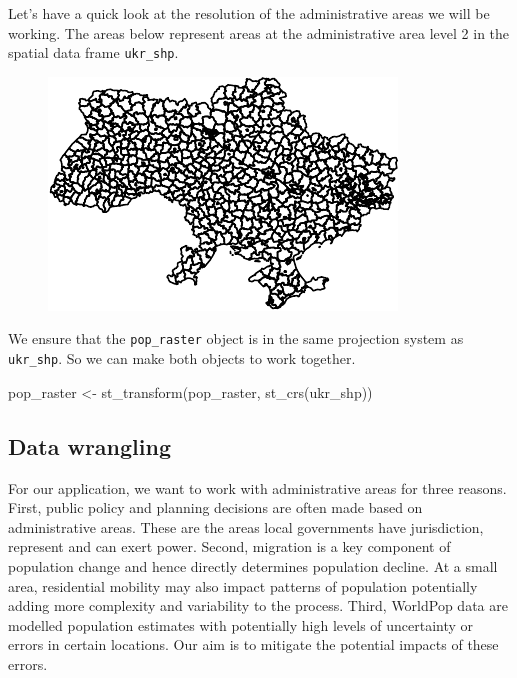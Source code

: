 \documentclass[
  letterpaper,
  DIV=11,
  numbers=noendperiod]{scrreprt}
\newenvironment{Shaded}{\begin{snugshade}}{\end{snugshade}}
\newcommand{\FunctionTok}[1]{\textcolor[rgb]{0.28,0.35,0.67}{#1}}
\newcommand{\NormalTok}[1]{\textcolor[rgb]{0.00,0.23,0.31}{#1}}
\newcommand{\OtherTok}[1]{\textcolor[rgb]{0.00,0.23,0.31}{#1}}
\newcommand{\SpecialCharTok}[1]{\textcolor[rgb]{0.37,0.37,0.37}{#1}}
\begin{document}
Let's have a quick look at the resolution of the administrative areas we
will be working. The areas below represent areas at the administrative
area level 2 in the spatial data frame \texttt{ukr\_shp}.

\begin{Shaded}
\end{Shaded}

\begin{figure}[H]

{\centering \includegraphics{sequence-analysis_files/figure-pdf/unnamed-chunk-8-1.pdf}

}

\end{figure}

We ensure that the \texttt{pop\_raster} object is in the same projection
system as \texttt{ukr\_shp}. So we can make both objects to work
together.

\begin{Shaded}
\begin{Highlighting}[]
\NormalTok{pop\_raster }\OtherTok{\textless{}{-}} \FunctionTok{st\_transform}\NormalTok{(pop\_raster, }\FunctionTok{st\_crs}\NormalTok{(ukr\_shp))                      }
\end{Highlighting}
\end{Shaded}

\hypertarget{data-wrangling}{%
\subsection{Data wrangling}\label{data-wrangling}}

For our application, we want to work with administrative areas for three
reasons. First, public policy and planning decisions are often made
based on administrative areas. These are the areas local governments
have jurisdiction, represent and can exert power. Second, migration is a
key component of population change and hence directly determines
population decline. At a small area, residential mobility may also
impact patterns of population potentially adding more complexity and
variability to the process. Third, WorldPop data are modelled population
estimates with potentially high levels of uncertainty or errors in
certain locations. Our aim is to mitigate the potential impacts of these
errors.
\end{document}
